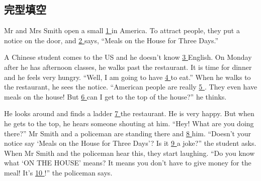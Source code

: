 \subsection{完型填空}
\item{
    Mr and Mrs Smith open a small \underline{ 1 } in America. To attract people, they put a notice on the door, and \underline{ 2 } says, ``Meals on the House for Three Days.''

    \hspace{2em} 
    A Chinese student comes to the US and he doesn't know \underline{ 3 } English. On Monday after he has afternoon classes, he walks past the restaurant. It is time for dinner and he feels very hungry. ``Well, I am going to have \underline{ 4 } to eat.'' When he walks to the restaurant, he sees the notice. ``American people are really \underline{ 5 }. They even have meals on the house! But \underline{ 6 } can I get to the top of the house?'' he thinks.

    \hspace{2em} 
    He looks around and finds a ladder \underline{ 7 } the restaurant. He is very happy. But when he gets to the top, he hears someone shouting at him. ``Hey! What are you doing there?'' Mr Smith and a policeman are standing there and \underline{ 8 } him. ``Doesn't your notice say `Meals on the House for Three Days'? Is it \underline{ 9 } a joke?'' the student asks. When Mr Smith and the policeman hear this, they start laughing. ``Do you know what `ON THE HOUSE' means? It means you don't have to give money for the meal! It's \underline{ 10 }!'' the policeman says.

}
